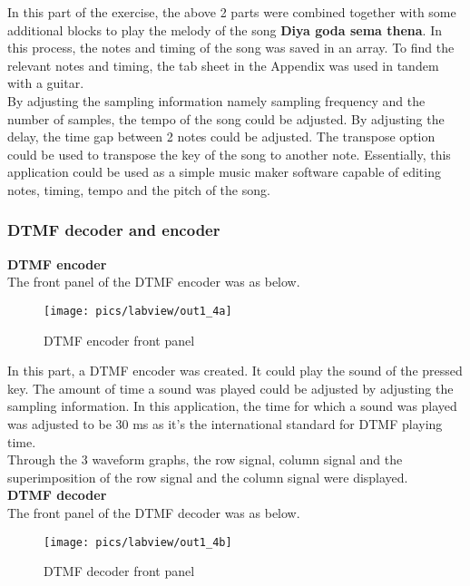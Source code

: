 \noindent
In this part of the exercise, the above 2 parts were combined together with some additional blocks to play the melody of the song \textbf{Diya goda sema thena}. In this process, the notes and timing of the song was saved in an array. To find the relevant notes and timing, the tab sheet in the Appendix was used in tandem with a guitar. \\

\noindent
By adjusting the sampling information namely sampling frequency and the number of samples, the tempo of the song could be adjusted. By adjusting the delay, the time gap between 2 notes could be adjusted. The transpose option could be used to transpose the key of the song to another note. Essentially, this application could be used as a simple music maker software capable of editing notes, timing, tempo and the pitch of the song. 

\subsubsection{DTMF decoder and encoder}

\textbf{DTMF encoder}\\

\noindent
The front panel of the DTMF encoder was as below.

\begin{figure}[!h]
	\centering
	\texttt{[image: pics/labview/out1\_4a]}
	\caption{DTMF encoder front panel}
	\label{fig:out14a}
\end{figure}

\noindent
In this part, a DTMF encoder was created. It could play the sound of the pressed key. The amount of time a sound was played could be adjusted by adjusting the sampling information. In this application, the time for which a sound was played was adjusted to be 30 ms as it's the international standard for DTMF playing time.\\

\noindent
Through the 3 waveform graphs, the row signal, column signal and the superimposition of the row signal and the column signal were displayed. \\

\noindent
\textbf{DTMF decoder}\\

\noindent
The front panel of the DTMF decoder was as below.

\begin{figure}[!h]
	\centering
	\texttt{[image: pics/labview/out1\_4b]}
	\caption{DTMF decoder front panel}
	\label{fig:out14b}
\end{figure}


